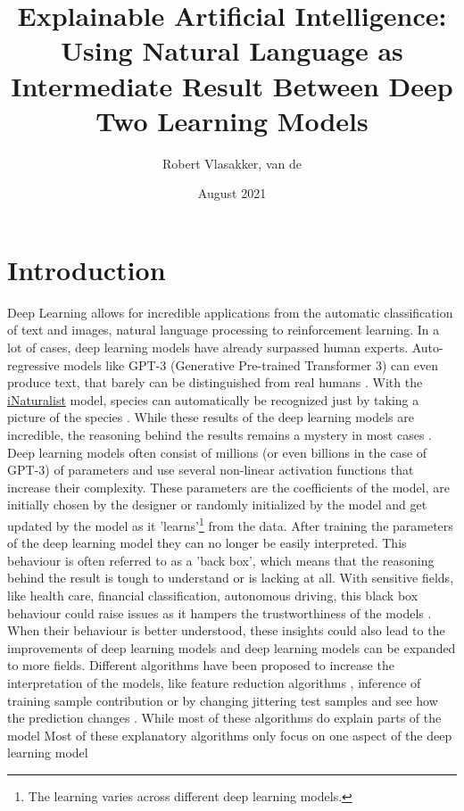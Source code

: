 \documentclass{article}
\title{Explainable Artificial Intelligence: Using Natural Language as Intermediate Result Between Deep Two Learning Models}
\author{Robert Vlasakker, van de}
\date{August 2021}
\begin{document}
\maketitle

\section{Introduction}
Deep Learning allows for incredible applications from the automatic classification of text and images, natural language processing to reinforcement learning.
In a lot of cases, deep learning models have already surpassed human experts.
Auto-regressive models like GPT-3 (Generative Pre-trained Transformer 3) can even produce text, that barely can be distinguished from real humans \cite{brown_language_2020}. 
With the \href{https://www.inaturalist.org/}{iNaturalist} model, species can automatically be recognized just by taking a picture of the species \cite{radford_learning_2021}.
While these results of the deep learning models are incredible, the reasoning behind the results remains a mystery in most cases \cite{li_interpretable_2021, losch_interpretability_2019}.
Deep learning models often consist of millions (or even billions in the case of GPT-3) of parameters and use several non-linear activation functions that increase their complexity.
These parameters are the coefficients of the model, are initially chosen by the designer or randomly initialized by the model and get updated by the model as it 'learns'\footnote{The learning varies across different deep learning models.} from the data.
After training the parameters of the deep learning model they can no longer be easily interpreted.
This behaviour is often referred to as a 'back box', which means that the reasoning behind the result is tough to understand or is lacking at all.
With sensitive fields, like health care, financial classification, autonomous driving, this black box behaviour could raise issues as it hampers the trustworthiness of the models \cite{carvalho_machine_2019}.
When their behaviour is better understood, these insights could also lead to the improvements of deep learning models \cite{amershi_modeltracker_2015} and deep learning models can be expanded to more fields.
Different algorithms have been proposed to increase the interpretation of the models, like feature reduction algorithms \cite{ribeiro_why_2016}, inference of training sample contribution \cite{koh_understanding_2020} or by changing jittering test samples and see how the prediction changes \cite{li_understanding_2017}.
While most of these algorithms do explain parts of the model
Most of these explanatory algorithms only focus on one aspect of the deep learning model 
\end{document}
